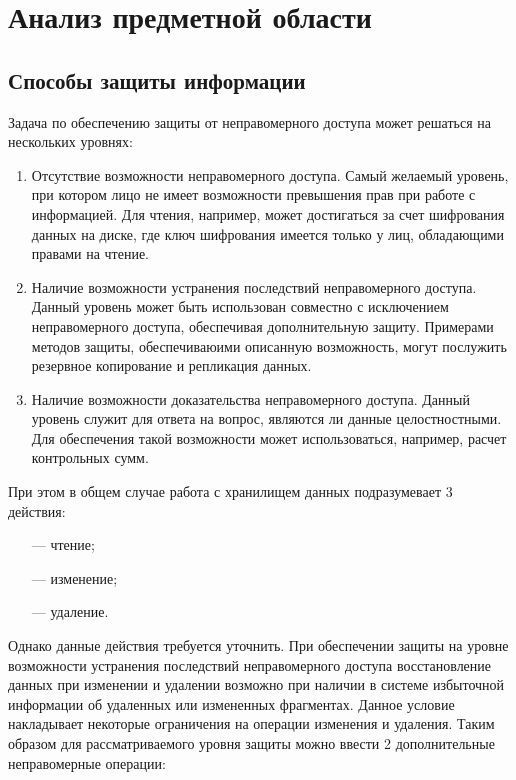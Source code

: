 \section{Анализ предметной области}

\subsection{Способы защиты информации}

Задача по обеспечению защиты от неправомерного доступа может решаться на нескольких уровнях:
\begin{enumerate}
    \item Отсутствие возможности неправомерного доступа. Самый желаемый уровень, при котором лицо не имеет возможности превышения прав при работе с информацией. Для чтения, например, может достигаться за счет шифрования данных на диске, где ключ шифрования имеется только у лиц, обладающими правами на чтение.
    \item Наличие возможности устранения последствий неправомерного доступа. Данный уровень может быть использован совместно с исключением неправомерного доступа, обеспечивая дополнительную защиту. Примерами методов защиты, обеспечиваюими описанную возможность, могут послужить резервное копирование и репликация данных.
    \item Наличие возможности доказательства неправомерного доступа. Данный уровень служит для ответа на вопрос, являются ли данные целостностными. Для обеспечения такой возможности может использоваться, например, расчет контрольных сумм.
\end{enumerate}

При этом в общем случае работа с хранилищем данных подразумевает 3 действия:
\begin{enumerate}
	\item [---] чтение;
	\item [---] изменение;
	\item [---] удаление.
\end{enumerate}

Однако данные действия требуется уточнить. При обеспечении защиты на уровне возможности устранения последствий неправомерного доступа восстановление данных при изменении и удалении возможно при наличии в системе избыточной информации об удаленных или измененных фрагментах. Данное условие накладывает некоторые ограничения на операции изменения и удаления. Таким образом для рассматриваемого уровня защиты можно ввести 2 дополнительные неправомерные операции:

